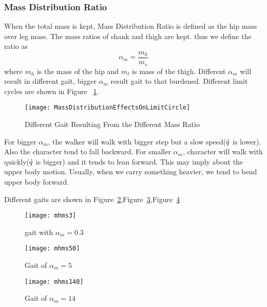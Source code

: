 \subsubsection*{Mass Distribution Ratio}
When the total mass is kept,
Mass Distribution Ratio is defined as the hip mass over leg mass. 
The mass ratios of shank and thigh are kept.
thus we define the ratio as
\[
\alpha_m=\frac{m_h}{m_s}
\]
where $m_h$ is the mass of the hip and $m_t$ is mass of the thigh.
Different $\alpha_m$ will result in different gait, bigger $\alpha_m$ result gait to that burdened.
Different limit cycles are shown in Figure ~\ref{fig:differentmh}.
\begin{figure}[!htbp]
  \begin{center}
     \texttt{[image: MassDistributionEffectsOnLimitCircle]}
    \caption{Different Gait Resulting From the Different Mass Ratio}
    \label{fig:differentmh}
\end{center}
\end{figure}

For bigger $\alpha_m$, the walker will walk with bigger step but a slow speed($\dot{q}$ is lower).
Also the character tend to fall backward.
For smaller $\alpha_m$, character will walk with quickly($\dot{q}$ is bigger) and it tends to lean forward.
This may imply about the upper body motion.
Usually, when we carry something heavier, we  tend to bend upper body forward.

Different gaits are shown in Figure~\ref{fig:massh1},Figure~\ref{fig:massh2},Figure~\ref{fig:massh3}
\begin{figure}[!htbp]
  \begin{center}
      \texttt{[image: mhms3]}
    \caption{gait with $\alpha_m=0.3$}
    \label{fig:massh1}
\end{center}
\end{figure}

\begin{figure}[!htbp]
  \begin{center}
      \texttt{[image: mhms50]}
    \caption{Gait of $\alpha_m=5$}
    \label{fig:massh2}
\end{center}
\end{figure}

\begin{figure}[!htbp]
  \begin{center}
      \texttt{[image: mhms140]}
    \caption{Gait of $\alpha_m=14$}
    \label{fig:massh3}
\end{center}
\end{figure}



